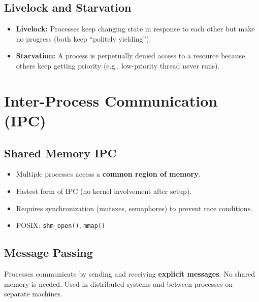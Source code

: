 \documentclass[11pt,a4paper]{article}
\begin{document}
\subsection{Livelock and Starvation}
\begin{itemize}[leftmargin=*, itemsep=3pt]
  \item \textbf{Livelock:} Processes keep changing state in response to each other but make no progress (both keep ``politely yielding'').
  \item \textbf{Starvation:} A process is perpetually denied access to a resource because others keep getting priority (e.g., low-priority thread never runs).
\end{itemize}

\section{Inter-Process Communication (IPC)}

\subsection{Shared Memory IPC}
\begin{itemize}[leftmargin=*, itemsep=3pt]
  \item Multiple processes access a \textbf{common region of memory}.
  \item Fastest form of IPC (no kernel involvement after setup).
  \item Requires synchronization (mutexes, semaphores) to prevent race conditions.
  \item POSIX: \texttt{shm\_open()}, \texttt{mmap()}
\end{itemize}

\subsection{Message Passing}
\begin{conceptbox}
Processes communicate by sending and receiving \textbf{explicit messages}. No shared memory is needed. Used in distributed systems and between processes on separate machines.
\end{conceptbox}

\begin{center}
\end{center}
\end{document}
